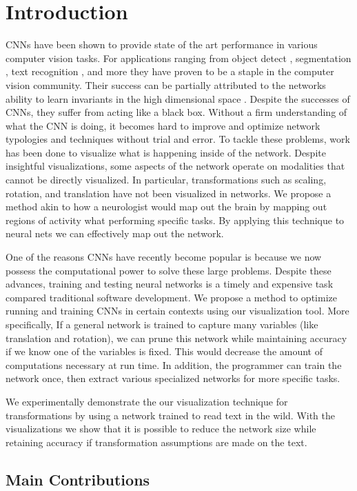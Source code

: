 \documentclass[10pt,twocolumn,letterpaper]{article}
\begin{document}
\section{Introduction}
CNNs have been shown to provide state of the art performance in various computer vision tasks.  For applications ranging from object detect \cite{}, segmentation \cite{}, text recognition \cite{}, and more they have proven to be a staple in the computer vision community. Their success can be partially attributed to the networks ability to learn invariants in the high dimensional space \cite{}. Despite the successes of CNNs, they suffer from acting like a black box. Without a firm understanding of what the CNN is doing, it becomes hard to improve and optimize network typologies and techniques without trial and error. To tackle these problems, work has been done to visualize what is happening inside of the network. Despite insightful visualizations, some aspects of the network operate on modalities that cannot be directly visualized. In particular, transformations such as scaling, rotation, and translation have not been visualized in networks. We propose a method akin to how a neurologist would map out the brain by mapping out regions of activity what performing specific tasks.\cite{} By applying this technique to neural nets we can effectively map out the network.

One of the reasons CNNs have recently become popular is because we now possess the computational power to solve these large problems. Despite these advances, training and testing neural networks is a timely and expensive task compared traditional software development. We propose a method to optimize running and training CNNs in certain contexts using our visualization tool. More specifically, If a general network is trained to capture many variables (like translation and rotation), we can prune this network while maintaining accuracy if we know one of the variables is fixed. This would decrease the amount of computations necessary  at run time. In addition, the programmer can train the network once, then extract various specialized networks for more specific tasks.

We experimentally demonstrate the our visualization technique for transformations by using a network trained to read text in the wild. With the visualizations we show that it is possible to reduce the network size while retaining accuracy if transformation assumptions are made on the text.

\subsection{Main Contributions}
\end{document}
